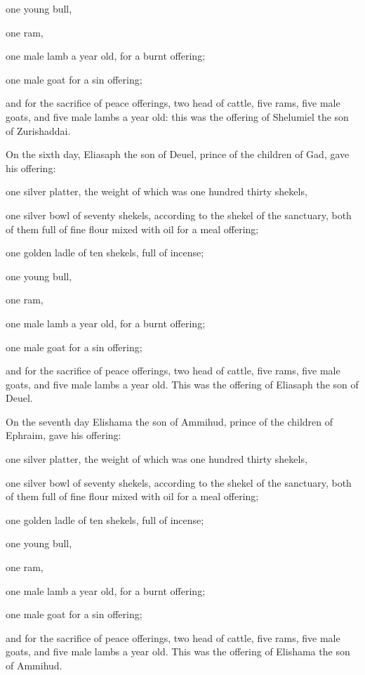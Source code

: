  one young bull,

one ram,

one male lamb a year old, for a burnt offering;

 one male goat for a sin offering;

 and for the sacrifice of peace offerings, two head of
cattle, five rams, five male goats, and five male lambs a year old: this
was the offering of Shelumiel the son of Zurishaddai.

 On the sixth day, Eliasaph the son of Deuel, prince of the
children of Gad,  gave his offering:

one silver platter, the weight of which was one hundred thirty shekels,

one silver bowl of seventy shekels, according to the shekel of the
sanctuary, both of them full of fine flour mixed with oil for a meal
offering;

 one golden ladle of ten shekels, full of incense;

 one young bull,

one ram,

one male lamb a year old, for a burnt offering;

 one male goat for a sin offering;

 and for the sacrifice of peace offerings, two head of
cattle, five rams, five male goats, and five male lambs a year old. This
was the offering of Eliasaph the son of Deuel.

 On the seventh day Elishama the son of Ammihud, prince of
the children of Ephraim,  gave his offering:

one silver platter, the weight of which was one hundred thirty shekels,

one silver bowl of seventy shekels, according to the shekel of the
sanctuary, both of them full of fine flour mixed with oil for a meal
offering;

 one golden ladle of ten shekels, full of incense;

 one young bull,

one ram,

one male lamb a year old, for a burnt offering;

 one male goat for a sin offering;

 and for the sacrifice of peace offerings, two head of
cattle, five rams, five male goats, and five male lambs a year old. This
was the offering of Elishama the son of Ammihud.


